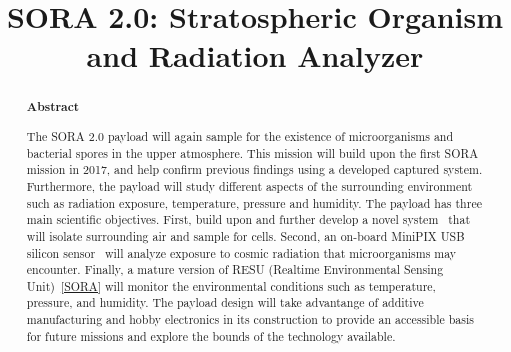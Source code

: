 \documentclass[aps,superscriptaddress,floatfix,nofootinbib,showpacs,amsmath,amssymb,altaffilletter,floatfix,onecolumn]{revtex4-1}
\begin{document}
\title{SORA 2.0: Stratospheric Organism and Radiation Analyzer}

\begin{abstract}
\begin{center}
{\bf Abstract}
\end{center}

The SORA 2.0 payload will again sample for the existence of microorganisms and bacterial spores in the upper atmosphere.  This mission will build upon the first SORA mission in 2017, and help confirm previous findings using a developed captured system. Furthermore, the payload will study different aspects of the surrounding environment such as radiation exposure, temperature, pressure and humidity. The payload has three main scientific objectives. First, build upon and further develop a novel system~\cite{SORA} that will isolate surrounding air and sample for cells. Second, an on-board MiniPIX USB silicon sensor~\cite{silicon_sensor} will analyze exposure to cosmic radiation that microorganisms may encounter. Finally, a mature version of RESU (Realtime Environmental Sensing Unit)~\ref{SORA} will monitor the environmental conditions such as temperature, pressure, and humidity. The payload design will take advantange of additive manufacturing and hobby electronics in its construction to provide an accessible basis for future missions and explore the bounds of the technology available.  

\newpage %
\end{abstract}

\setlength{\parindent}{1em}
\setdefaultleftmargin{1em}{1em}{}{}{}{}
\setcounter{page}{0}\thispagestyle{empty}
\maketitle
\onecolumngrid
\setcounter{tocdepth}{2}
\setcounter{page}{0}\thispagestyle{empty}
\tableofcontents
\setcounter{page}{0}\thispagestyle{empty}
\newpage
\onecolumngrid %


	
		
		

		
		
		
		
		
		
		
		
	
\end{document}
